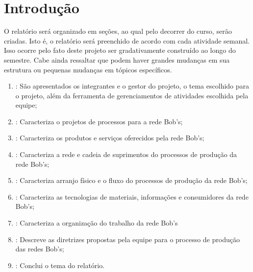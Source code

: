 \chapter[Introdução]{Introdução}
\label{chap:introducao}
	
	O relatório será organizado em seções, ao qual pelo decorrer do curso, serão criadas. Isto é, o relatório será preenchido de acordo com cada atividade semanal. Isso ocorre pelo fato deste projeto ser gradativamente construído ao longo do semestre. Cabe ainda ressaltar que podem haver grandes mudanças em sua estrutura ou pequenas mudanças em tópicos específicos.

	\begin{enumerate}
		\item{\textbf{}: São apresentados os integrantes e o gestor do projeto, o tema escolhido para o projeto, além da ferramenta de gerenciamentos de atividades escolhida pela equipe;}
		\item{\textbf{}: Caracteriza o projetos de processos para a rede Bob's;}
		\item{\textbf{}: Caracteriza os produtos e serviços oferecidos pela rede Bob's;}
		\item{\textbf{}: Caracteriza a rede e cadeia de suprimentos do processos de produção da rede Bob's;}
		\item{\textbf{}: Caracteriza arranjo físico e o fluxo do processos de produção da rede Bob's;}
		\item{\textbf{}: Caracteriza as tecnologias de materiais, informações e consumidores da rede Bob's;}
		\item{\textbf{}: Caracteriza a organização do trabalho da rede Bob's}
		\item{\textbf{}: Descreve as diretrizes propostas pela equipe para o processo de produção das redes Bob's;}
		\item{\textbf{}: Conclui o tema do relatório.}
	\end{enumerate}
